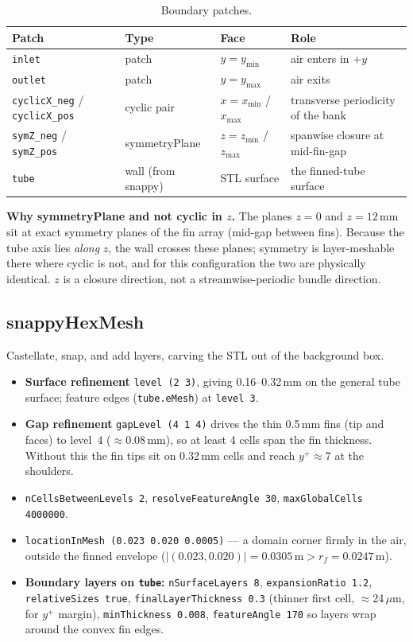 \documentclass[11pt]{article}
\newcommand{\file}[1]{\texttt{\small #1}}
\begin{document}
\begin{table}[h]\centering\small
\caption{Boundary patches.}\label{tab:patches}
\begin{tabular}{@{}llll@{}}
\toprule
Patch & Type & Face & Role\\
\midrule
\file{inlet} & patch & $y=y_\mathrm{min}$ & air enters in $+y$\\
\file{outlet} & patch & $y=y_\mathrm{max}$ & air exits\\
\file{cyclicX\_neg} / \file{cyclicX\_pos} & cyclic pair & $x=x_\mathrm{min}$ / $x_\mathrm{max}$ & transverse periodicity of the bank\\
\file{symZ\_neg} / \file{symZ\_pos} & symmetryPlane & $z=z_\mathrm{min}$ / $z_\mathrm{max}$ & spanwise closure at mid-fin-gap\\
\file{tube} & wall (from snappy) & STL surface & the finned-tube surface\\
\bottomrule
\end{tabular}
\end{table}

\textbf{Why symmetryPlane and not cyclic in $z$.} The planes $z=0$ and $z=12$\,mm sit at exact symmetry planes
of the fin array (mid-gap between fins). Because the tube axis lies \emph{along} $z$, the wall crosses these
planes; symmetry is layer-meshable there where cyclic is not, and for this configuration the two are
physically identical. $z$ is a closure direction, not a streamwise-periodic bundle direction.

\subsection{snappyHexMesh}

Castellate, snap, and add layers, carving the STL out of the background box.

\begin{itemize}[leftmargin=1.4em,itemsep=1pt]
\item \textbf{Surface refinement} \file{level (2 3)}, giving 0.16--0.32\,mm on the general tube surface;
feature edges (\file{tube.eMesh}) at \file{level 3}.
\item \textbf{Gap refinement} \file{gapLevel (4 1 4)} drives the thin 0.5\,mm fins (tip and faces) to level~4
($\approx$0.08\,mm), so at least 4 cells span the fin thickness. Without this the fin tips sit on 0.32\,mm
cells and reach $y^+\approx7$ at the shoulders.
\item \file{nCellsBetweenLevels 2}, \file{resolveFeatureAngle 30}, \file{maxGlobalCells 4000000}.
\item \file{locationInMesh (0.023 0.020 0.0005)} --- a domain corner firmly in the air, outside the finned
envelope ($|(0.023, 0.020)| = 0.0305\,\mathrm{m} > r_f = 0.0247$\,m).
\item \textbf{Boundary layers on \file{tube}:} \file{nSurfaceLayers 8}, \file{expansionRatio 1.2},
\file{relativeSizes true}, \file{finalLayerThickness 0.3} (thinner first cell, $\approx$24\,$\mu$m, for $y^+$
margin), \file{minThickness 0.008}, \file{featureAngle 170} so layers wrap around the convex fin edges.
\end{itemize}
\end{document}

